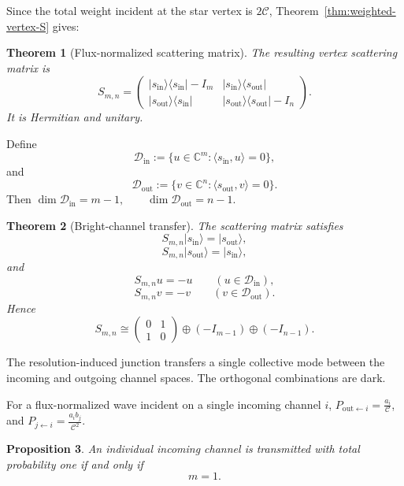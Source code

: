 \documentclass[11pt]{article}
\theoremstyle{plain}
\newtheorem{theorem}{Theorem}[section]
\newtheorem{proposition}[theorem]{Proposition}
\theoremstyle{definition}
\begin{document}
Since the total weight incident at the star vertex is
\(2\mathcal C\),
Theorem~\ref{thm:weighted-vertex-S} gives:

\begin{theorem}[Flux-normalized scattering matrix]
\label{thm:Bmn-S}
The resulting vertex scattering matrix is
\[
  S_{m,n}
  =
  \begin{pmatrix}
  |s_{\mathrm{in}}\rangle
  \langle s_{\mathrm{in}}|-I_m
  &
  |s_{\mathrm{in}}\rangle
  \langle s_{\mathrm{out}}|
  \\[2mm]
  |s_{\mathrm{out}}\rangle
  \langle s_{\mathrm{in}}|
  &
  |s_{\mathrm{out}}\rangle
  \langle s_{\mathrm{out}}|-I_n
  \end{pmatrix}.
\]
It is Hermitian and unitary.
\end{theorem}

Define
\[
  \mathcal D_{\mathrm{in}}
  :=
  \{
    u\in\mathbb C^m:
    \langle s_{\mathrm{in}},u\rangle=0
  \},
\]
and
\[
  \mathcal D_{\mathrm{out}}
  :=
  \{
    v\in\mathbb C^n:
    \langle s_{\mathrm{out}},v\rangle=0
  \}.
\]
Then
\(\dim\mathcal D_{\mathrm{in}}=m-1, \qquad \dim\mathcal D_{\mathrm{out}}=n-1\).

\begin{theorem}[Bright-channel transfer]
\label{thm:Bmn-bright-transfer}
The scattering matrix satisfies
\[
  S_{m,n}|s_{\mathrm{in}}\rangle
  =
  |s_{\mathrm{out}}\rangle,
\]
\[
  S_{m,n}|s_{\mathrm{out}}\rangle
  =
  |s_{\mathrm{in}}\rangle,
\]
and
\[
  S_{m,n}u=-u
  \qquad
  (u\in\mathcal D_{\mathrm{in}}),
\]
\[
  S_{m,n}v=-v
  \qquad
  (v\in\mathcal D_{\mathrm{out}}).
\]
Hence
\[
  S_{m,n}
  \cong
  \begin{pmatrix}
    0&1\\
    1&0
  \end{pmatrix}
  \oplus
  (-I_{m-1})
  \oplus
  (-I_{n-1}).
\]
\end{theorem}

The resolution-induced junction transfers a single collective mode
between the incoming and outgoing channel spaces. The orthogonal
combinations are dark.

For a flux-normalized wave incident on a single incoming channel \(i\),
\(P_{\mathrm{out}\leftarrow i} = \frac{a_i}{\mathcal C}\),
and
\(P_{j\leftarrow i} = \frac{a_ib_j}{\mathcal C^2}\).

\begin{proposition}
\label{prop:Bmn-perfect-individual}
An individual incoming channel is transmitted with total probability one
if and only if
\[
  m=1.
\]
\end{proposition}
\end{document}
